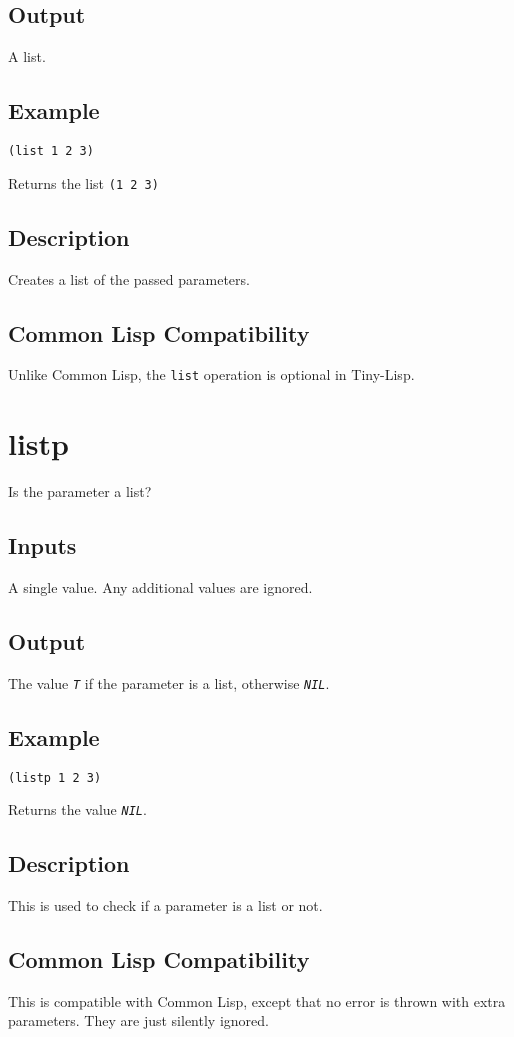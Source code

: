 \documentclass[10pt, openany]{book}
\newcommand{\constant}[1]{\emph{\texttt{#1}}}
\newcommand{\keyword}[1]{\texttt{#1}}
\newcommand{\tl}{Tiny-Lisp}
\newcommand{\cl}{Common Lisp}
\begin{document}
\subsection{Output}
A list.
\subsection{Example}
\begin{lstlisting}
(list 1 2 3)
\end{lstlisting}
Returns the list \keyword{(1 2 3)}
\subsection{Description}
Creates a list of the passed parameters.
\subsection{Common Lisp Compatibility}
Unlike \cl{}, the \keyword{list} operation is optional in \tl{}.

\section{listp}
Is the parameter a list?
\subsection{Inputs}
A single value.  Any additional values are ignored.
\subsection{Output}
The value \constant{T} if the parameter is a list, otherwise \constant{NIL}.
\subsection{Example}
\begin{lstlisting}
(listp 1 2 3)
\end{lstlisting}
Returns the value \constant{NIL}.
\subsection{Description}
This is used to check if a parameter is a list or not.
\subsection{Common Lisp Compatibility}
This is compatible with \cl, except that no error is thrown with extra parameters.  They are just silently ignored.
\end{document}
